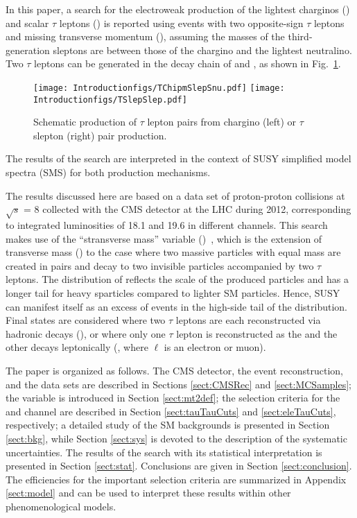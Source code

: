 In this paper, a search for the electroweak production of the lightest charginos (\chione) and scalar $\tau$  leptons (\stau) is reported using events 
with two opposite-sign $\tau$ leptons and 
missing transverse momentum (\MPT), assuming the masses of the third-generation sleptons are between those of the 
chargino and the lightest neutralino. 
Two $\tau$ leptons can be generated in the decay chain of \chione and \sTau, as shown in Fig.~\ref{fig:Productions}. 
\begin{figure}[!htb]
\centering
\texttt{[image: Introductionfigs/TChipmSlepSnu.pdf]}
\texttt{[image: Introductionfigs/TSlepSlep.pdf]}

\caption{Schematic production of $\tau$ lepton pairs from chargino (left) or $\tau$ slepton (right) pair production.}
\label{fig:Productions}
\end{figure}
The results of the search are interpreted in the context of SUSY simplified model spectra (SMS) \cite{Alwall:2008ag,alves:sms} for both
production mechanisms.


The results discussed here are based on a data set of proton-proton 
collisions at $\sqrt{s}$ = 8\TeV
collected with the CMS detector at the LHC during 2012, corresponding to integrated
luminosities of 18.1 and 19.6 \invfb in different channels. 
This search makes use of the ``stransverse mass'' variable (\mttwo)~\cite{Lester:1999tx,Barr:2003rg},
which is the extension of transverse mass (\mt) to the case 
where two massive particles with equal mass are created in pairs  
and decay to two invisible particles accompanied by two $\tau$ leptons.  
The distribution of \mttwo reflects the scale of the produced particles and has a longer tail for heavy sparticles
compared to lighter SM particles. Hence, SUSY 
can manifest itself
as an excess of events in the high-side tail of the \mttwo distribution. 
Final states are considered where
two $\tau$ leptons are each reconstructed via hadronic decays (\tauTau), or where only one $\tau$ lepton is reconstructed as the \Tau and the other decays leptonically (\leptonTau, where $\ell$ is an electron or muon). 

The paper is organized as follows.  The CMS detector, the event reconstruction, and the data sets are described
in Sections \ref{sect:CMSRec} and \ref{sect:MCSamples}; the \mttwo variable is introduced in Section \ref{sect:mt2def}; 
the selection criteria for the \tauTau and \leptonTau channel are described in Section \ref{sect:tauTauCuts} and \ref{sect:eleTauCuts}, respectively;
a detailed study of the SM backgrounds is presented in Section \ref{sect:bkg}, while Section \ref{sect:sys} 
is devoted to the description of the systematic uncertainties.  The results of the search with its statistical interpretation is presented in 
Section \ref{sect:stat}. Conclusions are given in Section \ref{sect:conclusion}. The efficiencies for the important selection criteria are summarized in Appendix \ref{sect:model} and can be used to interpret these results within other phenomenological models. 




